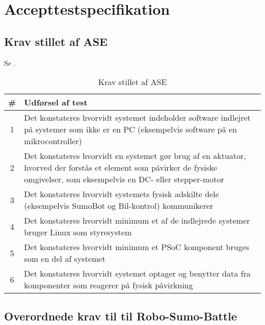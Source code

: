 \section{Accepttestspecifikation}

\subsection{Krav stillet af ASE}
Se .
\begin{table}[]
\centering
\caption{Krav stillet af ASE}\label{tab:ASE Krav}
\begin{tabular}{c p{7cm}}\toprule
\# & \textbf{Udførsel af test} \\ \midrule
1 & Det konstateres hvorvidt systemet indeholder software indlejret på systemer som ikke er en PC (eksempelvis software på en mikrocontroller)\\\midrule
2 & Det konstateres hvorvidt en systemet gør brug af en aktuator, hvorved der forstås et element som påvirker de fysiske omgivelser, som eksempelvis en DC- eller stepper-motor \\\midrule
3 & Det konstateres hvorvidt systemets fysisk adskilte dele (eksempelvis SumoBot og Bil-kontrol) kommunikerer\\\midrule
4 & Det konstateres hvorvidt minimum et af de indlejrede systemer bruger Linux som styresystem \\\midrule
5 & Det konstateres hvorvidt minimum et PSoC komponent bruges som en del af systemet\\\midrule
6 & Det konstateres hvorvidt systemet optager og benytter data fra komponenter som reagerer på fysisk påvirkning\\\bottomrule
\end{tabular}
\end{table}

\subsection{Overordnede krav til til Robo-Sumo-Battle}

